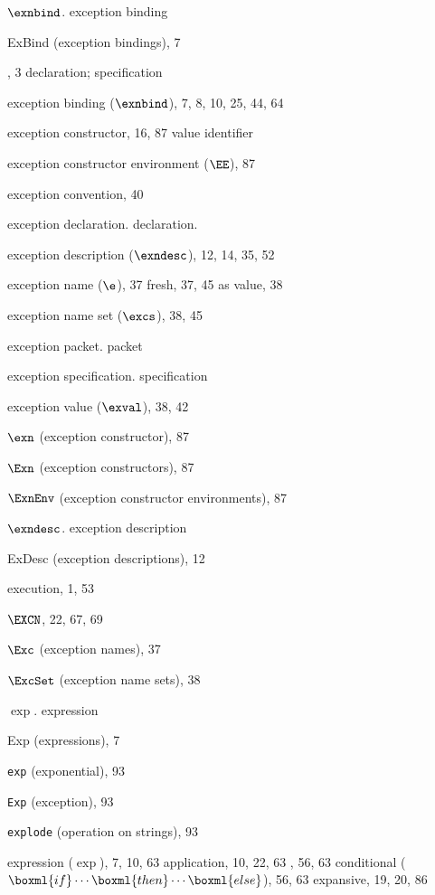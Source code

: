\begin{theindex}
\item $\exnbind$. \see exception binding
\item ExBind (exception bindings), 7
\item \EXCEPTION, 3
\subitem \seealso declaration; specification
\item exception binding ($\exnbind$), 7, 8, 10, 25, 44, 64
\item exception constructor, 16, 87
\subitem \seealso value identifier
\item exception constructor environment ($\EE$), 87
\item exception convention, 40
\item exception declaration. \see declaration.
\item exception description ($\exndesc$), 12, 14, 35, 52
\item exception name ($\e$), 37
\subitem fresh, 37, 45
\subitem as value, 38
\item exception name set ($\excs$), 38, 45
\item exception packet. \see packet
\item exception specification. \see specification
\item exception value ($\exval$), 38, 42
\item $\exn$ (exception constructor), 87
\item $\Exn$ (exception constructors), 87
\item $\ExnEnv$ (exception constructor environments), 87
\item $\exndesc$. \see exception description
\item ExDesc (exception descriptions), 12
\item execution, 1, 53
\item $\EXCN$, 22, 67, 69
\item $\Exc$ (exception names), 37
\item $\ExcSet$ (exception name sets), 38
\item $\exp$. \see expression
\item Exp (expressions), 7
\item {\tt exp} (exponential), 93
\item {\tt Exp} (exception), 93
\item {\tt explode} (operation on strings), 93
\item expression ($\exp$), 7, 10, 63
\subitem application, 10, 22, 63
\subitem {}, 56, 63
\subitem conditional ($\boxml{if}\cdots\boxml{then}\cdots\boxml{else}$), 56, 63
\subitem expansive, 19, 20, 86

\end{theindex}
